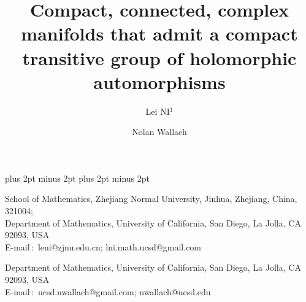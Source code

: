 \documentclass{amse-new}
\numberwithin{equation}{section} %
\begin{document}

\abovedisplayskip 6pt plus 2pt minus 2pt \belowdisplayskip 6pt
plus 2pt minus 2pt
\def\vsp{\vspace{1mm}}
\def\th#1{\vspace{1mm}\noindent{\bf #1}\quad}
\def\proof{\vspace{1mm}\noindent{\it Proof}\quad}
\def\no{\nonumber}
\newenvironment{prof}[1][Proof]{\noindent\textit{#1}\quad }
{\hfill $\Box$\vspace{0.7mm}}
\def\q{\quad} \def\qq{\qquad}
\allowdisplaybreaks[4]








\title{Compact, connected, complex manifolds that admit a compact transitive group of
holomorphic automorphisms        %
}                  %

\author{Lei \uppercase{Ni}$^1$}             %
    {School of Mathematics, Zhejiang Normal University, Jinhua, Zhejiang, China, 321004;\\
Department of Mathematics, University of California, San Diego, La Jolla, CA
92093, USA\\
    E-mail\,$:$ leni@zjnu.edu.cn; lni.math.ucsd@gmail.com }

\author{Nolan  Wallach}     %
    {Department of Mathematics, University of California, San Diego, La
Jolla, CA 92093, USA\\
    E-mail\,$:$  ucsd.nwallach@gmail.com; nwallach@ucsd.edu}
\end{document}
